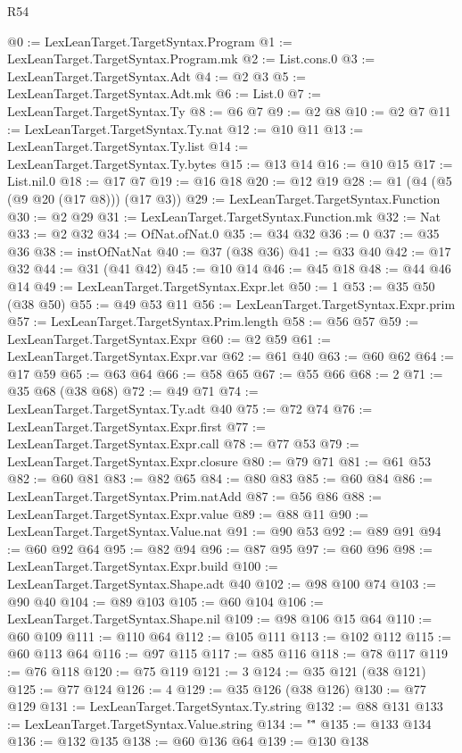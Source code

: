 \begin{lexlean}{R54}
\begin{coremodule}
@0 := LexLeanTarget.TargetSyntax.Program
@1 := LexLeanTarget.TargetSyntax.Program.mk
@2 := List.cons.{0}
@3 := LexLeanTarget.TargetSyntax.Adt
@4 := @2 @3
@5 := LexLeanTarget.TargetSyntax.Adt.mk
@6 := List.{0}
@7 := LexLeanTarget.TargetSyntax.Ty
@8 := @6 @7
@9 := @2 @8
@10 := @2 @7
@11 := LexLeanTarget.TargetSyntax.Ty.nat
@12 := @10 @11
@13 := LexLeanTarget.TargetSyntax.Ty.list
@14 := LexLeanTarget.TargetSyntax.Ty.bytes
@15 := @13 @14
@16 := @10 @15
@17 := List.nil.{0}
@18 := @17 @7
@19 := @16 @18
@20 := @12 @19
@28 := @1 (@4 (@5 (@9 @20 (@17 @8))) (@17 @3))
@29 := LexLeanTarget.TargetSyntax.Function
@30 := @2 @29
@31 := LexLeanTarget.TargetSyntax.Function.mk
@32 := Nat
@33 := @2 @32
@34 := OfNat.ofNat.{0}
@35 := @34 @32
@36 := 0
@37 := @35 @36
@38 := instOfNatNat
@40 := @37 (@38 @36)
@41 := @33 @40
@42 := @17 @32
@44 := @31 (@41 @42)
@45 := @10 @14
@46 := @45 @18
@48 := @44 @46 @14
@49 := LexLeanTarget.TargetSyntax.Expr.let
@50 := 1
@53 := @35 @50 (@38 @50)
@55 := @49 @53 @11
@56 := LexLeanTarget.TargetSyntax.Expr.prim
@57 := LexLeanTarget.TargetSyntax.Prim.length
@58 := @56 @57
@59 := LexLeanTarget.TargetSyntax.Expr
@60 := @2 @59
@61 := LexLeanTarget.TargetSyntax.Expr.var
@62 := @61 @40
@63 := @60 @62
@64 := @17 @59
@65 := @63 @64
@66 := @58 @65
@67 := @55 @66
@68 := 2
@71 := @35 @68 (@38 @68)
@72 := @49 @71
@74 := LexLeanTarget.TargetSyntax.Ty.adt @40
@75 := @72 @74
@76 := LexLeanTarget.TargetSyntax.Expr.first
@77 := LexLeanTarget.TargetSyntax.Expr.call
@78 := @77 @53
@79 := LexLeanTarget.TargetSyntax.Expr.closure
@80 := @79 @71
@81 := @61 @53
@82 := @60 @81
@83 := @82 @65
@84 := @80 @83
@85 := @60 @84
@86 := LexLeanTarget.TargetSyntax.Prim.natAdd
@87 := @56 @86
@88 := LexLeanTarget.TargetSyntax.Expr.value
@89 := @88 @11
@90 := LexLeanTarget.TargetSyntax.Value.nat
@91 := @90 @53
@92 := @89 @91
@94 := @60 @92 @64
@95 := @82 @94
@96 := @87 @95
@97 := @60 @96
@98 := LexLeanTarget.TargetSyntax.Expr.build
@100 := LexLeanTarget.TargetSyntax.Shape.adt @40
@102 := @98 @100 @74
@103 := @90 @40
@104 := @89 @103
@105 := @60 @104
@106 := LexLeanTarget.TargetSyntax.Shape.nil
@109 := @98 @106 @15 @64
@110 := @60 @109
@111 := @110 @64
@112 := @105 @111
@113 := @102 @112
@115 := @60 @113 @64
@116 := @97 @115
@117 := @85 @116
@118 := @78 @117
@119 := @76 @118
@120 := @75 @119
@121 := 3
@124 := @35 @121 (@38 @121)
@125 := @77 @124
@126 := 4
@129 := @35 @126 (@38 @126)
@130 := @77 @129
@131 := LexLeanTarget.TargetSyntax.Ty.string
@132 := @88 @131
@133 := LexLeanTarget.TargetSyntax.Value.string
@134 := "\""
@135 := @133 @134
@136 := @132 @135
@138 := @60 @136 @64
@139 := @130 @138

\end{coremodule}
\end{lexlean}
